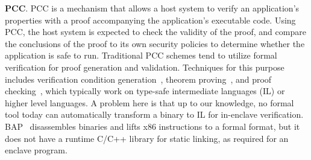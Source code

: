 

\vspace{3pt}\noindent\textbf{PCC}. PCC is a mechanism that allows a host system to verify an application's properties with a proof accompanying the application's executable code. Using PCC, the host system is expected to check the validity of the proof, and compare the conclusions of the proof to its own security policies to determine whether the application is safe to run. %
Traditional PCC schemes tend to utilize formal verification for proof generation and validation. Techniques for this purpose includes verification condition generation~\cite{homeier1995mechanically,colby2000certifying}, theorem proving~\cite{paulson2000isabelle,de2008z3,bertot2013interactive}, and proof checking~\cite{appel2003trustworthy}, which typically work on type-safe intermediate languages (IL) or higher level languages. A problem here is that up to our knowledge, no formal tool today can automatically transform a binary to IL for in-enclave verification. BAP~\cite{brumley2011bap} disassembles binaries and lifts x86 instructions to a formal format, but it does not have a runtime C/C++ library
for static linking, as required for an enclave program.

